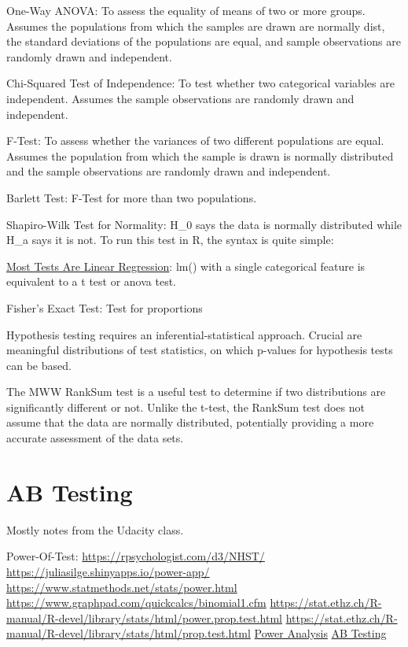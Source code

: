 \documentclass[]{book}
\begin{document}
One-Way ANOVA: To assess the equality of means of two or more groups. Assumes the populations from which the samples are drawn are normally dist, the standard deviations of the populations are equal, and sample observations are randomly drawn and independent.

Chi-Squared Test of Independence: To test whether two categorical variables are independent. Assumes the sample observations are randomly drawn and independent.

F-Test: To assess whether the variances of two different populations are equal. Assumes the population from which the sample is drawn is normally distributed and the sample observations are randomly drawn and independent.

Barlett Test: F-Test for more than two populations.

Shapiro-Wilk Test for Normality: H\_0 says the data is normally distributed while H\_a says it is not. To run this test in R, the syntax is quite simple:

\href{https://lindeloev.github.io/tests-as-linear/}{Most Tests Are Linear Regression}: lm() with a single categorical feature is equivalent to a t test or anova test.

Fisher's Exact Test: Test for proportions

Hypothesis testing requires an inferential-statistical approach. Crucial are meaningful distributions of test statistics, on which p-values for hypothesis tests can be based.

The MWW RankSum test is a useful test to determine if two distributions are significantly different or not. Unlike the t-test, the RankSum test does not assume that the data are normally distributed, potentially providing a more accurate assessment of the data sets.

\hypertarget{ab-testing}{%
\section{AB Testing}\label{ab-testing}}

Mostly notes from the Udacity class.

Power-Of-Test: \url{https://rpsychologist.com/d3/NHST/} \url{https://juliasilge.shinyapps.io/power-app/} \url{https://www.statmethods.net/stats/power.html} \url{https://www.graphpad.com/quickcalcs/binomial1.cfm} \url{https://stat.ethz.ch/R-manual/R-devel/library/stats/html/power.prop.test.html} \url{https://stat.ethz.ch/R-manual/R-devel/library/stats/html/prop.test.html} \href{https://www.statmethods.net/stats/power.html}{Power Analysis} \href{http://www.evanmiller.org/announcing-evans-awesome-ab-tools.html}{AB Testing}
\end{document}
